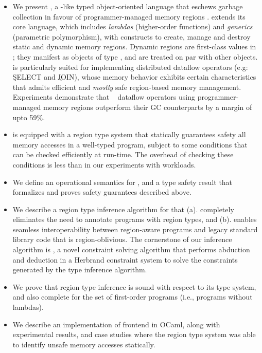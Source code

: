 \begin{itemize}
  \item We present \name, a \csharp-like typed object-oriented language
  that eschews garbage collection in favour of programmer-managed
  memory regions . \name extends its core language, which includes
  \emph{lambdas} (higher-order functions) and \emph{generics}
  (parametric polymorphism), with constructs to create, manage and
  destroy static and dynamic memory regions. Dynamic regions are
  first-class values in \name; they manifest as objects of type
  , and are treated on par with other objects. \name is
  particularly suited for implementing distributed dataflow operators
  (e.g: \c{SELECT} and \c{JOIN}), whose memory behavior exhibits
  certain characteristics that admits efficient and \emph{mostly} safe
  region-based memory management. Experiments demonstrate that
  \naiad~\cite{naiad} dataflow operators using programmer-managed
  memory regions outperform their GC counterparts by a margin of upto
  59\%. 

  \item \name is equipped with a region type system that statically
  guarantees safety all memory accesses in a well-typed program,
  subject to some conditions that can be checked efficiently at
  run-time. The overhead of checking these conditions is less than
   in our experiments with \naiad workloads.

  \item We define an operational semantics for \name, and a type
  safety result that formalizes and proves safety guarantees described
  above.

  \item We describe a region type inference algorithm for \name that
  (a). completely eliminates the need to annotate \name programs with
  region types, and (b). enables seamless interoperability between
  region-aware \name programs and legacy standard library code that is
  region-oblivious. The cornerstone of our inference algorithm is
  \csolve, a novel constraint solving algorithm that performs
  abduction and deduction in a Herbrand constraint system to solve the
  constraints generated by the type inference algorithm.

  \item We prove that region type inference is sound with respect to
  its type system, and also complete for the set of first-order
  programs (i.e., programs without lambdas). 

  \item We describe an implementation of \name frontend in OCaml,
  along with experimental results, and case studies where the region
  type system was able to identify unsafe memory accesses statically.
  
\end{itemize}

